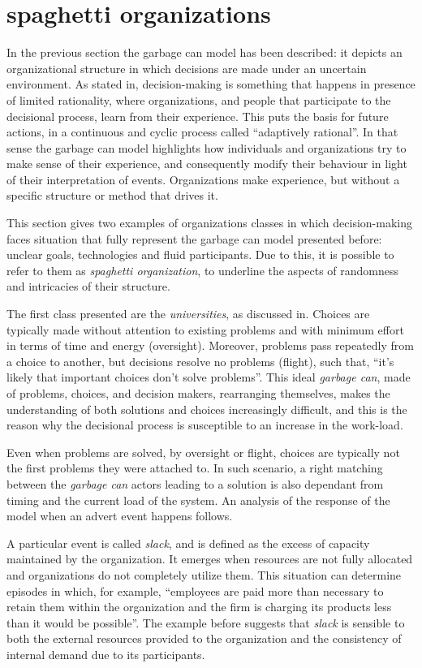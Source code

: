 \section{spaghetti organizations}
In the previous section the garbage can model has been described: it depicts an organizational structure in which decisions are made under an uncertain environment. As stated in\cite{4}, decision-making is something that happens in presence of limited rationality, where organizations, and people that participate to the decisional process, learn from their experience. This puts the basis for future actions, in a continuous and cyclic process called ``adaptively rational''. In that sense the garbage can model highlights how individuals and organizations try to make sense of their experience, and consequently modify their behaviour in light of their interpretation of events. Organizations make experience, but without a specific structure or method that drives it.

This section gives two examples of organizations classes in which decision-making faces situation that fully represent the garbage can model presented before: unclear goals, technologies and fluid participants. Due to this, it is possible to refer to them as \textit{spaghetti organization}, to underline the aspects of randomness and intricacies of their structure.

The first class presented are the \textit{universities}, as discussed in\cite{1}. Choices are typically made without attention to existing problems and with minimum effort in terms of time and energy (oversight). Moreover, problems pass repeatedly from a choice to another, but decisions resolve no problems (flight), such that, ``it’s likely that important choices don’t solve problems''. This ideal \textit{garbage can}, made of problems, choices, and decision makers, rearranging themselves, makes the understanding of both solutions and choices increasingly difficult, and this is the reason why the decisional process is susceptible to an increase in the work-load.

Even when problems are solved, by oversight or flight, choices are typically not the first problems they were attached to. In such scenario, a right matching between the \textit{garbage can} actors leading to a solution is also dependant from timing and the current load of the system.
An analysis of the response of the model when an advert event happens follows.

A particular event is called \textit{slack}, and is defined as the excess of capacity maintained by the organization. It emerges when resources are not fully allocated and organizations do not completely utilize them. This situation can determine episodes in which, for example, ``employees are paid more than necessary to retain them within the organization and the firm is charging its products less than it would be possible''\cite{13}. The example before suggests that \textit{slack} is sensible to both the external resources provided to the organization and the consistency of internal demand due to its participants.

